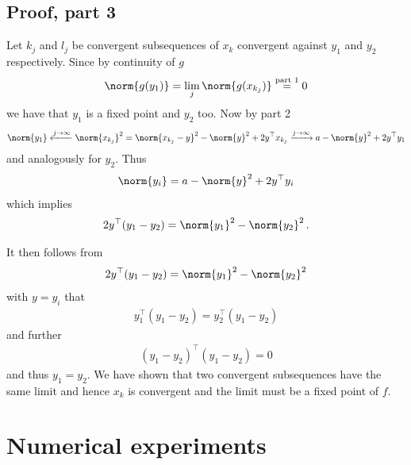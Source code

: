 \subsection{Proof, part 3}

\begin{frame}
	\begin{proofs}
	Let $k_j$ and $l_j$ be convergent subsequences of $x_k$ convergent against $y_1$ and $y_2$ respectively. Since by continuity of $g$
	\begin{align*}
		\norm{g(y_1)}=\lim_j\norm{g(x_{k_j})}\stackrel{\text{part 1}}{=}0
	\end{align*}
	we have that $y_1$ is a fixed point and $y_2$ too.
	Now by part 2
	\begin{align*}
		\norm{y_1} 
		\xleftarrow{j\to\infty} \norm{x_{k_j}}^2
		= \norm{x_{k_j}-y}^2-\norm{y}^2+2y^\top x_{k_j}
		\xrightarrow{j\to\infty} a-\norm{y}^2+2y^\top y_1
	\end{align*}
	and analogously for $y_2$. Thus
	\begin{align*}
		\norm{y_i}=a-\norm{y}^2+2y^\top y_i
	\end{align*}
	which implies
	\begin{align*}
		2y^\top(y_1-y_2) = \norm{y_1}^2-\norm{y_2}^2\,.
	\end{align*}
	\end{proofs}
\end{frame}


\begin{frame}
	\begin{proofs}
	It then follows from 
	\begin{align*}
		2y^\top(y_1-y_2) = \norm{y_1}^2-\norm{y_2}^2
	\end{align*}
	with $y=y_i$ that
	\begin{align*}
		y_1^\top(y_1-y_2) = y_2^\top(y_1-y_2)
	\end{align*}
	and further
	\begin{align*}
		(y_1-y_2)^\top(y_1-y_2) = 0
	\end{align*}
	and thus $y_1=y_2$. We have shown that two convergent subsequences have the same limit and hence $x_k$ is convergent and the limit must be a fixed point of $f$.
	\end{proofs}
\end{frame}


\section{Numerical experiments}

